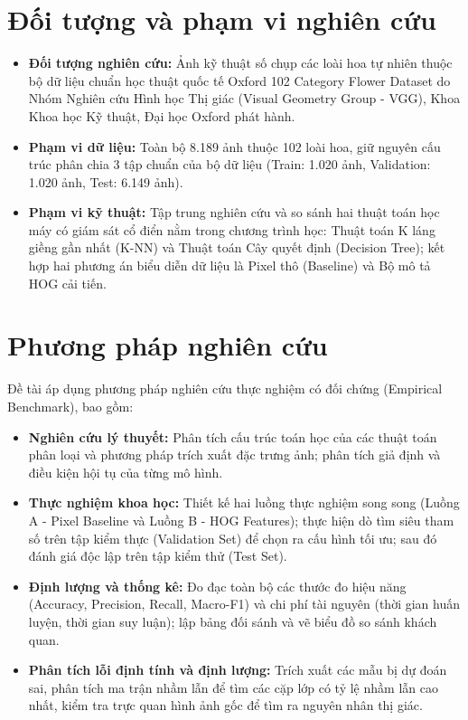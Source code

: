 \documentclass[../DoAn.tex]{subfiles}
\begin{document}
\section{Đối tượng và phạm vi nghiên cứu}
\begin{itemize}
    \item \textbf{Đối tượng nghiên cứu:} Ảnh kỹ thuật số chụp các loài hoa tự nhiên thuộc bộ dữ liệu chuẩn học thuật quốc tế Oxford 102 Category Flower Dataset do Nhóm Nghiên cứu Hình học Thị giác (Visual Geometry Group - VGG), Khoa Khoa học Kỹ thuật, Đại học Oxford phát hành.
    \item \textbf{Phạm vi dữ liệu:} Toàn bộ 8.189 ảnh thuộc 102 loài hoa, giữ nguyên cấu trúc phân chia 3 tập chuẩn của bộ dữ liệu (Train: 1.020 ảnh, Validation: 1.020 ảnh, Test: 6.149 ảnh).
    \item \textbf{Phạm vi kỹ thuật:} Tập trung nghiên cứu và so sánh hai thuật toán học máy có giám sát cổ điển nằm trong chương trình học: Thuật toán K láng giềng gần nhất (K-NN) và Thuật toán Cây quyết định (Decision Tree); kết hợp hai phương án biểu diễn dữ liệu là Pixel thô (Baseline) và Bộ mô tả HOG cải tiến.
\end{itemize}

\section{Phương pháp nghiên cứu}
Đề tài áp dụng phương pháp nghiên cứu thực nghiệm có đối chứng (Empirical Benchmark), bao gồm:
\begin{itemize}
    \item \textbf{Nghiên cứu lý thuyết:} Phân tích cấu trúc toán học của các thuật toán phân loại và phương pháp trích xuất đặc trưng ảnh; phân tích giả định và điều kiện hội tụ của từng mô hình.
    \item \textbf{Thực nghiệm khoa học:} Thiết kế hai luồng thực nghiệm song song (Luồng A - Pixel Baseline và Luồng B - HOG Features); thực hiện dò tìm siêu tham số trên tập kiểm thực (Validation Set) để chọn ra cấu hình tối ưu; sau đó đánh giá độc lập trên tập kiểm thử (Test Set).
    \item \textbf{Định lượng và thống kê:} Đo đạc toàn bộ các thước đo hiệu năng (Accuracy, Precision, Recall, Macro-F1) và chi phí tài nguyên (thời gian huấn luyện, thời gian suy luận); lập bảng đối sánh và vẽ biểu đồ so sánh khách quan.
    \item \textbf{Phân tích lỗi định tính và định lượng:} Trích xuất các mẫu bị dự đoán sai, phân tích ma trận nhầm lẫn để tìm các cặp lớp có tỷ lệ nhầm lẫn cao nhất, kiểm tra trực quan hình ảnh gốc để tìm ra nguyên nhân thị giác.
\end{itemize}
\end{document}
